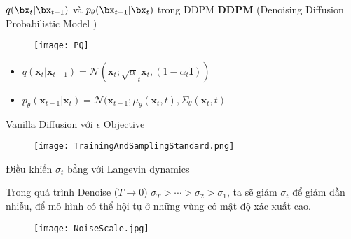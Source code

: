 \begin{frame}{$q(\bx_t | \bx_{t-1})$ và $p_{\theta}(\bx_{t-1} | \bx_t ) $  trong DDPM }
	\textbf{DDPM} (Denoising Diffusion Probabilistic Model \cite{ho2020denoisingdiffusionprobabilisticmodels})
\begin{figure}
	\centering
	\texttt{[image: PQ]}
\end{figure}
	
\begin{itemize}
	\item $q (\mathbf{x}_{t} | \mathbf{x}_{t-1}) = \mathcal{N}(\mathbf{x}_t; \sqrt{\alpha}_t \mathbf{x}_t, (1 - \alpha_t \mathbf{I}))$
	\item $p_\theta (\mathbf{x}_{t-1} | \mathbf{x}_{t}) = \mathcal{N}(\mathbf{x}_{t-1}; \mu_\theta{(\mathbf{x}_t, t)}, {\Sigma}_{\theta} {  (\mathbf{x}_t, t ) }$
\end{itemize}
%
%
%

\end{frame}

\begin{frame}{Vanilla Diffusion với $\epsilon$ Objective}
	\begin{figure}
		\centering
		\texttt{[image: TrainingAndSamplingStandard.png]}
	\end{figure}
\end{frame}

\begin{frame}{Điều khiển $\sigma_t$ bằng với Langevin dynamics}
	
Trong quá trình Denoise ($T \rightarrow 0$)  $\sigma_T > \cdots  >  \sigma_2 > \sigma_1$, ta sẽ giảm $\sigma_t$ để giảm dần nhiễu, để mô hình có thể hội tụ ở những vùng có mật độ xác xuất cao.
	\begin{figure}
		\centering
		\texttt{[image: NoiseScale.jpg]}
	\end{figure}
\end{frame}

